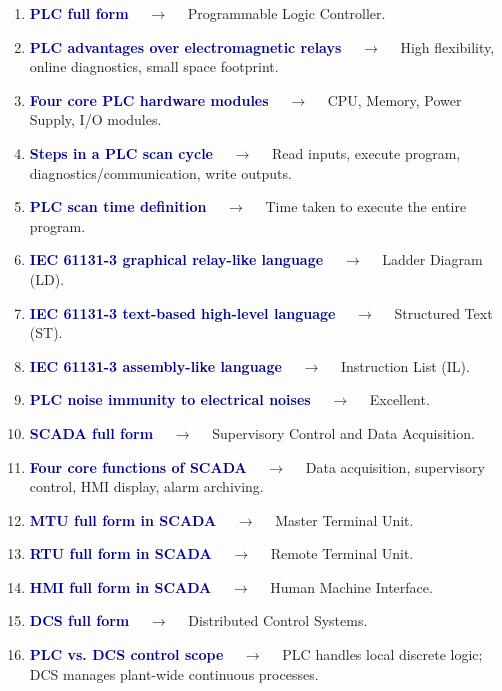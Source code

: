 \documentclass[11pt,a4paper]{article}
\begin{document}
\begin{enumerate}[label=\arabic*., leftmargin=*, labelsep=0.8em, itemsep=0.35em, parsep=0.1em, topsep=0.2em]
  \item \textcolor{darkblue}{\textbf{PLC full form}} $\quad\to\quad$ Programmable Logic Controller.
  \item \textcolor{darkblue}{\textbf{PLC advantages over electromagnetic relays}} $\quad\to\quad$ High flexibility, online diagnostics, small space footprint.
  \item \textcolor{darkblue}{\textbf{Four core PLC hardware modules}} $\quad\to\quad$ CPU, Memory, Power Supply, I/O modules.
  \item \textcolor{darkblue}{\textbf{Steps in a PLC scan cycle}} $\quad\to\quad$ Read inputs, execute program, diagnostics/communication, write outputs.
  \item \textcolor{darkblue}{\textbf{PLC scan time definition}} $\quad\to\quad$ Time taken to execute the entire program.
  \item \textcolor{darkblue}{\textbf{IEC 61131-3 graphical relay-like language}} $\quad\to\quad$ Ladder Diagram (LD).
  \item \textcolor{darkblue}{\textbf{IEC 61131-3 text-based high-level language}} $\quad\to\quad$ Structured Text (ST).
  \item \textcolor{darkblue}{\textbf{IEC 61131-3 assembly-like language}} $\quad\to\quad$ Instruction List (IL).
  \item \textcolor{darkblue}{\textbf{PLC noise immunity to electrical noises}} $\quad\to\quad$ Excellent.
  \item \textcolor{darkblue}{\textbf{SCADA full form}} $\quad\to\quad$ Supervisory Control and Data Acquisition.
  \item \textcolor{darkblue}{\textbf{Four core functions of SCADA}} $\quad\to\quad$ Data acquisition, supervisory control, HMI display, alarm archiving.
  \item \textcolor{darkblue}{\textbf{MTU full form in SCADA}} $\quad\to\quad$ Master Terminal Unit.
  \item \textcolor{darkblue}{\textbf{RTU full form in SCADA}} $\quad\to\quad$ Remote Terminal Unit.
  \item \textcolor{darkblue}{\textbf{HMI full form in SCADA}} $\quad\to\quad$ Human Machine Interface.
  \item \textcolor{darkblue}{\textbf{DCS full form}} $\quad\to\quad$ Distributed Control Systems.
  \item \textcolor{darkblue}{\textbf{PLC vs. DCS control scope}} $\quad\to\quad$ PLC handles local discrete logic; DCS manages plant-wide continuous processes.

\end{enumerate}
\end{document}
